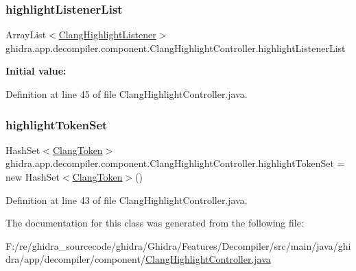 \subsubsection{\texorpdfstring{highlightListenerList}{highlightListenerList}}
{\footnotesize\ttfamily Array\+List$<$\mbox{\hyperlink{interfaceghidra_1_1app_1_1decompiler_1_1component_1_1_clang_highlight_listener}{Clang\+Highlight\+Listener}}$>$ ghidra.\+app.\+decompiler.\+component.\+Clang\+Highlight\+Controller.\+highlight\+Listener\+List\hspace{0.3cm}{\ttfamily [protected]}}

{\bfseries Initial value\+:}
\begin{DoxyCode}{0}
\DoxyCodeLine{=}

\end{DoxyCode}


Definition at line 45 of file Clang\+Highlight\+Controller.\+java.

\mbox{\label{classghidra_1_1app_1_1decompiler_1_1component_1_1_clang_highlight_controller_a5fac1cc729ad200de5659b7752772608}} 
\subsubsection{\texorpdfstring{highlightTokenSet}{highlightTokenSet}}
{\footnotesize\ttfamily Hash\+Set$<$\mbox{\hyperlink{classghidra_1_1app_1_1decompiler_1_1_clang_token}{Clang\+Token}}$>$ ghidra.\+app.\+decompiler.\+component.\+Clang\+Highlight\+Controller.\+highlight\+Token\+Set = new Hash\+Set$<$\mbox{\hyperlink{classghidra_1_1app_1_1decompiler_1_1_clang_token}{Clang\+Token}}$>$()\hspace{0.3cm}{\ttfamily [protected]}}



Definition at line 43 of file Clang\+Highlight\+Controller.\+java.



The documentation for this class was generated from the following file\+:\begin{DoxyCompactItemize}
\item 
F\+:/re/ghidra\+\_\+sourcecode/ghidra/\+Ghidra/\+Features/\+Decompiler/src/main/java/ghidra/app/decompiler/component/\mbox{\hyperlink{_clang_highlight_controller_8java}{Clang\+Highlight\+Controller.\+java}}\end{DoxyCompactItemize}
